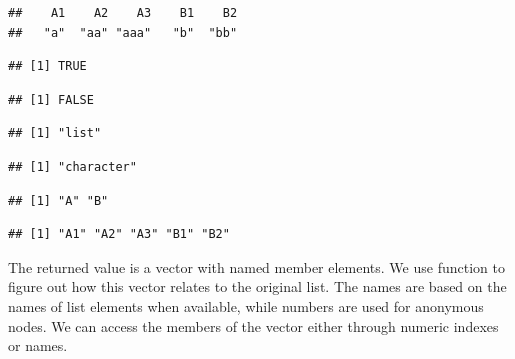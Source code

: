 \documentclass[krantz2]{krantz}\usepackage{knitr}
\begin{document}
\begin{knitrout}\footnotesize
{}\color{fgcolor}\begin{kframe}
\begin{alltt}
 \hlkwb{<-} 
\end{alltt}
\begin{verbatim}
##    A1    A2    A3    B1    B2
##   "a"  "aa" "aaa"   "b"  "bb"
\end{verbatim}
\begin{alltt}
\end{alltt}
\begin{verbatim}
## [1] TRUE
\end{verbatim}
\begin{alltt}
\end{alltt}
\begin{verbatim}
## [1] FALSE
\end{verbatim}
\begin{alltt}
\end{alltt}
\begin{verbatim}
## [1] "list"
\end{verbatim}
\begin{alltt}
\end{alltt}
\begin{verbatim}
## [1] "character"
\end{verbatim}
\begin{alltt}
\end{alltt}
\begin{verbatim}
## [1] "A" "B"
\end{verbatim}
\begin{alltt}
\end{alltt}
\begin{verbatim}
## [1] "A1" "A2" "A3" "B1" "B2"
\end{verbatim}
\end{kframe}
\end{knitrout}

The returned value is a vector with named member elements. We use function  to figure out how this vector relates to the original list. The names are based on the names of list elements when available, while numbers are used for anonymous nodes. We can access the members of the vector either through numeric indexes or names.
\end{document}
